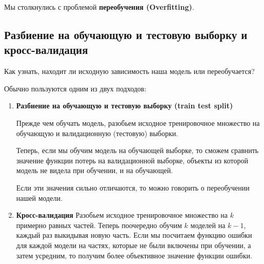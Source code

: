 Мы столкнулись с проблемой \textbf{переобучения (Overfitting)}.

\subsection{Разбиение на обучающую и тестовую выборку и кросс-валидация}

Как узнать, находит ли исходную зависимость наша модель или переобучается?

Обычно пользуются одним из двух подходов:
\begin{enumerate}
    \item \textbf{Разбиение на обучающую и тестовую выборку (train test split)}
    
    Прежде чем обучать модель, разобьем исходное тренировочное множество на обучающую и валидационную (тестовую) выборки.
    
    Теперь, если мы обучим модель на обучающей выборке, то сможем сравнить значение функции потерь на валидационной выборке, объекты из которой модель не видела при обучении, и на обучающей.
    
    Если эти значения сильно отличаются, то можно говорить о переобучении нашей модели.
    
    \item \textbf{Кросс-валидация}
    Разобьем исходное тренировочное множество на $k$ примерно равных частей.
    Теперь поочередно обучим $k$ моделей на $k - 1$, каждый раз выкидывая новую часть. Если мы посчитаем функцию ошибки для каждой модели на частях, которые не были включены при обучении, а затем усредним, то получим более объективное значение функции ошибки.
    
\end{enumerate}